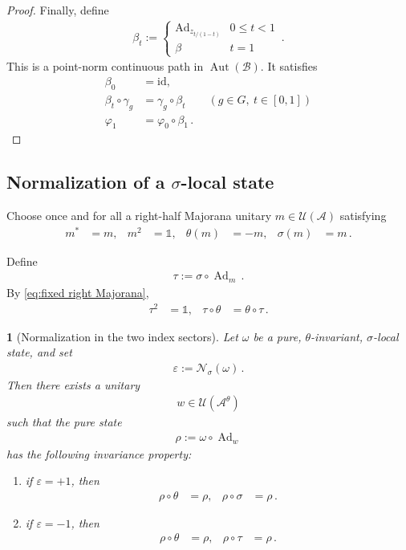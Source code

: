 \documentclass[a4paper,10pt]{article}
\numberwithin{equation}{section}
\theoremstyle{plain}
\theoremstyle{plain}
\newtheorem{lem}[lem]{\protect\lemmaname}
\theoremstyle{plain}
\theoremstyle{plain}
\theoremstyle{plain}
\theoremstyle{remark}
\theoremstyle{definition}
\providecommand{\lemmaname}{Lemma}
\newcommand{\calA}{\mathcal{A}}
\newcommand{\calB}{\mathcal{B}}
\newcommand{\calN}{\mathcal{N}}
\newcommand{\calU}{\mathcal{U}}
\newcommand{\Ad}[1]{\operatorname{Ad}_{#1}}
\newcommand{\Id}{\mathds{1}}
\newcommand{\eq}[1]{\begin{align*}#1\end{align*}}
\newcommand{\eql}[1]{\begin{align}#1\end{align}}
\begin{document}
\begin{proof}
Finally, define
\eq{
    \beta_t
    :=
    \begin{cases}
        \Ad{z_{t/(1-t)}}
        &
        0\leq t<1\\
        \beta
        &
        t=1
    \end{cases}\,.
}
This is a point-norm continuous path in
\(\operatorname{Aut}(\calB)\). It satisfies
\eq{
    \beta_0
    &=
    \mathrm{id},\\
    \beta_t\circ\gamma_g
    &=
    \gamma_g\circ\beta_t
    \qquad
    (g\in G,\ t\in[0,1])\\
    \varphi_1
    &=
    \varphi_0\circ\beta_1\,.
}
\end{proof}
\subsection{Normalization of a \(\sigma\)-local state}

Choose once and for all a right-half Majorana unitary
\(m\in\calU(\calA)\) satisfying
\eql{
    m^*
    &=
    m,&
    m^2
    &=
    \Id,&
    \theta(m)
    &=
    -m,&
    \sigma(m)
    &=
    m
    \label{eq:fixed right Majorana}\,.
}

Define
\eql{
    \tau
    :=
    \sigma\circ\Ad{m}
    \label{eq:twisted locality involution}\,.
}
By \cref{eq:fixed right Majorana},
\eq{
    \tau^2
    &=
    \Id,&
    \tau\circ\theta
    &=
    \theta\circ\tau\,.
}

\begin{lem}[Normalization in the two index sectors]
\label{lem:normalization in the two index sectors}
Let \(\omega\) be a pure, \(\theta\)-invariant, \(\sigma\)-local state,
and set
\eq{
    \varepsilon
    :=
    \calN_\sigma(\omega)\,.
}
Then there exists a unitary
\eq{
    w\in\calU(\calA^\theta)
}
such that the pure state
\eq{
    \rho
    :=
    \omega\circ\Ad{w}
}
has the following invariance property:
\begin{enumerate}
    \item if \(\varepsilon=+1\), then
    \eq{
        \rho\circ\theta
        &=
        \rho,&
        \rho\circ\sigma
        &=
        \rho\,.
    }
    \item if \(\varepsilon=-1\), then
    \eq{
        \rho\circ\theta
        &=
        \rho,&
        \rho\circ\tau
        &=
        \rho\,.
    }
\end{enumerate}
\end{lem}
\end{document}
